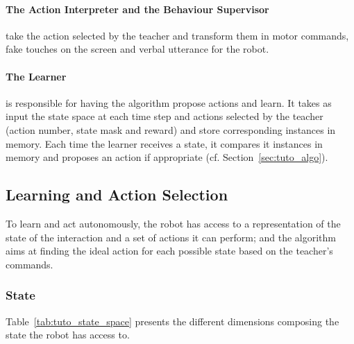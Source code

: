 \paragraph{The Action Interpreter and the Behaviour Supervisor} take the action selected by the teacher and transform them in motor commands, fake touches on the screen and verbal utterance for the robot.

\paragraph{The Learner} is responsible for having the algorithm propose actions and learn. It takes as input the state space at each time step and actions selected by the teacher (action number, state mask and reward) and store corresponding instances in memory. Each time the learner receives a state, it compares it instances in memory and proposes an action if appropriate (cf. Section~\ref{sec:tuto_algo}).

\subsection{Learning and Action Selection}

To learn and act autonomously, the robot has access to a representation of the state of the interaction and a set of actions it can perform; and the algorithm aims at finding the ideal action for each possible state based on the teacher's commands.

\subsubsection{State}\label{sec:tuto_state}

Table~\ref{tab:tuto_state_space} presents the different dimensions composing the state the robot has access to.

